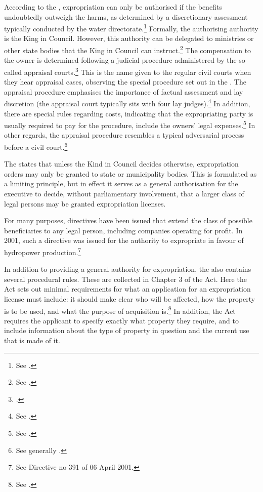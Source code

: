According to the \cite{ea59}, expropriation can only be authorised if the benefits undoubtedly outweigh the harms, as determined by a discretionary assessment typically conducted by the water directorate.\footnote{See \cite[2]{ea59}.} Formally, the authorising authority is the King in Council. However, this authority can be delegated to ministries or other state bodies that the King in Council can instruct.\footnote{See \cite[5]{ea59}.} The compensation to the owner is determined following a judicial procedure administered by the so-called appraisal courts.\footnote{\cite[2]{ea59}.} This is the name given to the regular civil courts when they hear appraisal cases, observing the special procedure set out in the \cite{aa17}. The appraisal procedure emphasises the importance of factual assessment and lay discretion (the appraisal court typically sits with four lay judges).\footnote{See \cite[11-12]{aa17}.} In addition, there are special rules regarding costs, indicating that the expropriating party is usually required to pay for the procedure, include the owners' legal expenses.\footnote{See \cite[54]{aa17}.} In other regards, the appraisal procedure resembles a typical adversarial process before a civil court.\footnote{See generally \cite{dyrkolbotn15}.} 

The \cite{ea59} states that unless the Kind in Council decides otherwise, expropriation orders may only be granted to state or municipality bodies. This is formulated as a limiting principle, but in effect it serves as a general authorisation for the executive to decide, without parliamentary involvement, that a larger class of legal persons may be granted expropriation licenses. 

For many purposes, directives have been issued that extend the class of possible beneficiaries to any legal person, including companies operating for profit. In 2001, such a directive was issued for the authority to expropriate in favour of hydropower production.\footnote{See Directive no 391 of 06 April 2001.} 

In addition to providing a general authority for expropriation, the \cite{ea59} also contains several procedural rules. These are collected in Chapter 3 of the Act. Here the Act sets out minimal requirements for what an application for an expropriation license must include: it should make clear who will be affected, how the property is to be used, and what the purpose of acquisition is.\footnote{See \cite[11]{ea59}.} In addition, the Act requires the applicant to specify exactly what property they require, and to include information about the type of property in question and the current use that is made of it.

